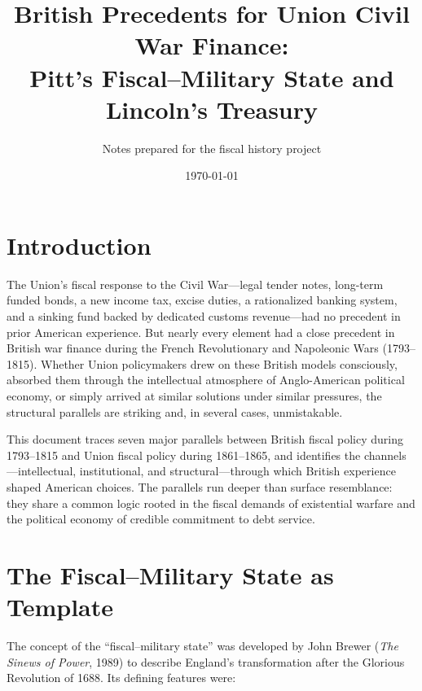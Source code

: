 \documentclass[12pt]{article}
\title{British Precedents for Union Civil War Finance:\\
Pitt's Fiscal--Military State and Lincoln's Treasury}
\author{Notes prepared for the fiscal history project}
\date{\today}
\begin{document}
\maketitle
\thispagestyle{empty}

\newpage

\tableofcontents

\newpage

\section{Introduction}

The Union's fiscal response to the Civil War---legal tender notes,
long-term funded bonds, a new income tax, excise duties, a rationalized
banking system, and a sinking fund backed by dedicated customs
revenue---had no precedent in prior American experience. But nearly every
element had a close precedent in British war finance during the French
Revolutionary and Napoleonic Wars (1793--1815). Whether Union
policymakers drew on these British models consciously, absorbed them
through the intellectual atmosphere of Anglo-American political economy,
or simply arrived at similar solutions under similar pressures, the
structural parallels are striking and, in several cases, unmistakable.

This document traces seven major parallels between British fiscal policy
during 1793--1815 and Union fiscal policy during 1861--1865, and
identifies the channels---intellectual, institutional, and
structural---through which British experience shaped American choices.
The parallels run deeper than surface resemblance: they share a common
logic rooted in the fiscal demands of existential warfare and the
political economy of credible commitment to debt service.

\section{The Fiscal--Military State as Template}

The concept of the ``fiscal--military state'' was developed by John
Brewer (\textit{The Sinews of Power}, 1989) to describe England's
transformation after the Glorious Revolution of 1688. Its defining
features were:
\end{document}

